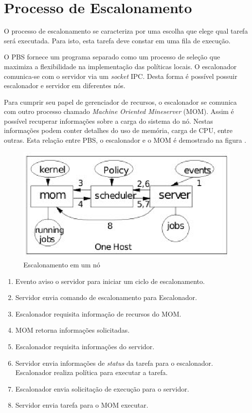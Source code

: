 \section{Processo de Escalonamento}

O processo de escalonamento se caracteriza por uma escolha que elege qual tarefa será executada. Para isto, esta tarefa deve constar em uma fila de execução.

O PBS fornece um programa separado como um processo de seleção que maximiza a flexibilidade na implementação das políticas locais. O escalonador comunica-se com o servidor via um \emph{socket} IPC. Desta forma é possível possuir escalonador e servidor em diferentes nós.

Para cumprir seu papel de gerenciador de recursos, o escalonador se comunica com outro processo chamado \emph{Machine Oriented Mineserver} (MOM). Assim é possível recuperar informações sobre a carga do sistema do nó. Nestas informações podem conter detalhes do uso de memória, carga de CPU, entre outras. Esta relação entre PBS, o escalonador e o MOM é demostrado na figura \cite{Bayucan1998}.

\begin{figure}[htb]
\begin{center}
\includegraphics[scale=0.9]{./img/PbsMom.eps}
\caption{Escalonamento em um nó}
\label{fig:Pbs_MOM}
\end{center}
\end{figure}

\begin{center}
	\begin{enumerate}
		\item Evento aviso o servidor para iniciar um ciclo de escalonamento.
		\item Servidor envia comando de escalonamento para Escalonador.
		\item Escalonador requisita informação de recursos do MOM.
		\item MOM retorna informações solicitadas.
		\item Escalonador requisita informações do servidor.
		\item Servidor envia informações de \emph{status} da tarefa para o escalonador. Escalonador realiza política para executar a tarefa.
		\item Escalonador envia solicitação de execução para o servidor.
		\item Servidor envia tarefa para o MOM executar.
	\end{enumerate}
\end{center}

